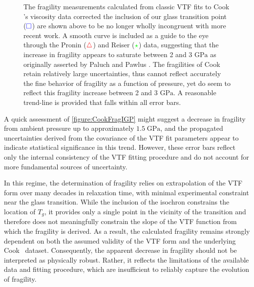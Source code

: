 \begin{figure}[!htbp]
	
	\caption{The fragility measurements calculated from classic VTF fits to Cook \etal's viscosity data corrected \via the inclusion of our \tgp glass transition point ($\color{blue}\square$) are shown above to be no longer wholly incongruent with more recent work. A smooth curve is included as a guide to the eye through the Pronin ($\color{red}\triangle$) and Reiser \etal ($\color{green}\star$) data, suggesting that the increase in fragility appears to saturate between 2 and 3 $\si{\giga\pascal}$ as originally asserted by Paluch \protect\nolinebreak\cite{Paluch} and Pawlus \protect\nolinebreak\cite{Pawlus}. The fragilities of Cook \etal retain relatively large uncertainties, thus cannot reflect accurately the fine behavior of fragility as a function of pressure, yet do seem to reflect this fragility increase between 2 and 3 $\si{\giga\pascal}$. A reasonable trend-line is provided that falls within all error bars.} 
	\label{figure:CookProninReiser}
\end{figure}

A quick assessment of \fig \nolinebreak \ref{figure:CookFragIGP} might suggest a decrease in fragility from ambient pressure up to approximately $1.5\;\si{\giga\pascal}$, and the propagated uncertainties derived from the covariance of the VTF fit parameters appear to indicate statistical significance in this trend. However, these error bars reflect only the internal consistency of the VTF fitting procedure and do not account for more fundamental sources of uncertainty.

In this regime, the determination of fragility relies on extrapolation of the VTF form over many decades in relaxation time, with minimal experimental constraint near the glass transition. While the inclusion of the \tgp isochron constrains the location of $T_g$, it provides only a single point in the vicinity of the transition and therefore does not meaningfully constrain the slope of the VTF function from which the fragility is derived. As a result, the calculated fragility remains strongly dependent on both the assumed validity of the VTF form and the underlying Cook \etal\ dataset. Consequently, the apparent decrease in fragility should not be interpreted as physically robust. Rather, it reflects the limitations of the available data and fitting procedure, which are insufficient to reliably capture the evolution of fragility.

